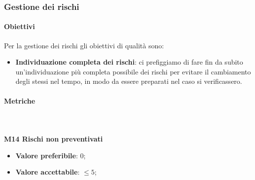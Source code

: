 		\subsubsection{Gestione dei rischi} 
			\paragraph{Obiettivi}
			Per la gestione dei rischi gli obiettivi di qualità sono:
			\begin{itemize}
				\item \textbf{Individuazione completa dei rischi}: ci prefiggiamo di fare fin da subito un'individuazione più completa possibile dei rischi per evitare il cambiamento degli stessi nel tempo, in modo da essere preparati nel caso si verificassero.
			\end{itemize}
			\paragraph{Metriche} \mbox{} \\ \\
			\textbf{M14 Rischi non preventivati} 
			\begin{itemize}
				\item \textbf{Valore preferibile}: 0;
				\item \textbf{Valore accettabile}: $ \le 5$;
			\end{itemize}			

